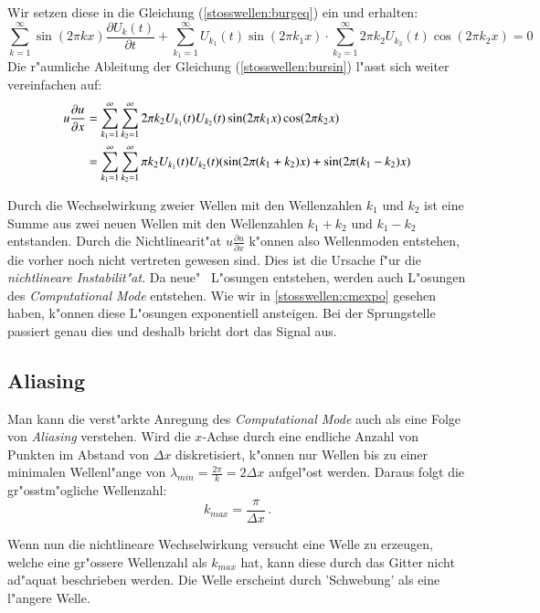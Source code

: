 \begin{refsection}
Wir setzen diese in die Gleichung (\ref{stosswellen:burgeq}) ein und erhalten:
\begin{equation}
	\sum_{k=1}^{\infty}\sin(2\pi k x) \frac{\partial U_{k}(t)}{\partial t} + \sum_{k_{1}=1}^{\infty} U_{k_{1}}(t) \sin(2\pi k_{1}x) \cdot \sum_{k_{2}=1}^{\infty}2\pi k_{2} U_{k_{2}}(t) \cos (2\pi k_{2} x)
	= 0
	\label{stosswellen:bursin}
\end{equation}
Die r"aumliche Ableitung der Gleichung (\ref{stosswellen:bursin}) l"asst
sich weiter vereinfachen auf:
\begin{align}
	u\frac{\partial u}{\partial x} &= 
	\sum_{k_{1}=1}^{\infty} \sum_{k_{2}=1}^{\infty} 2 \pi k_{2} U_{k_{1}}(t) U_{k_{2}}(t) \sin (2\pi k_{1}x) \cos (2\pi k_{2}x) \notag\\
	&= \sum_{k_{1}=1}^{\infty} \sum_{k_{2}=1}^{\infty} \pi k_{2} U_{k_{1}}(t) U_{k_{2}}(t) (\sin (2\pi (k_{1}+k_{2})x) + \sin(2\pi (k_{1}-k_{2})x)
\end{align}

Durch die Wechselwirkung zweier Wellen mit den Wellenzahlen $k_{1}$
und $k_{2}$ ist eine Summe aus zwei neuen Wellen mit den Wellenzahlen
$k_{1}\!+\!k_{2}$ und $k_{1}\!-\!k_{2}$ entstanden. Durch die
Nichtlinearit"at $u\frac{\partial u}{\partial x}$ k"onnen also Wellenmoden
entstehen, die vorher noch nicht vertreten gewesen sind. Dies ist die
Ursache f"ur die \textit{nichtlineare Instabilit"at}. Da  \grqq neue"
\, L"osungen entstehen, werden auch L"osungen des \textit{Computational
Mode} entstehen. Wie wir in \ref{stosswellen:cmexpo} gesehen haben,
k"onnen diese L"osungen exponentiell ansteigen. Bei der Sprungstelle
passiert genau dies und deshalb bricht dort das Signal aus. 

\subsection{Aliasing}
Man kann die verst"arkte Anregung des \textit{Computational Mode} auch
als eine Folge von \textit{Aliasing} verstehen. Wird die $x$-Achse durch
eine endliche Anzahl von Punkten im Abstand von $\Delta x$ diskretisiert,
k"onnen nur Wellen bis zu einer minimalen Wellenl"ange von $\lambda_{min}
\!=\! \frac{2 \pi}{k}\! = \! 2 \Delta x$ aufgel"ost werden. Daraus folgt
die gr"osstm"ogliche Wellenzahl:
\begin{equation}
	k_{max} = \frac{\pi}{\Delta x}\,.
\end{equation}

Wenn nun die nichtlineare Wechselwirkung versucht eine Welle zu erzeugen,
welche eine gr"ossere Wellenzahl als $k_{max}$ hat, kann diese durch
das Gitter nicht ad"aquat beschrieben werden. Die Welle erscheint durch
'Schwebung' als eine l"angere Welle. 


\end{refsection}
